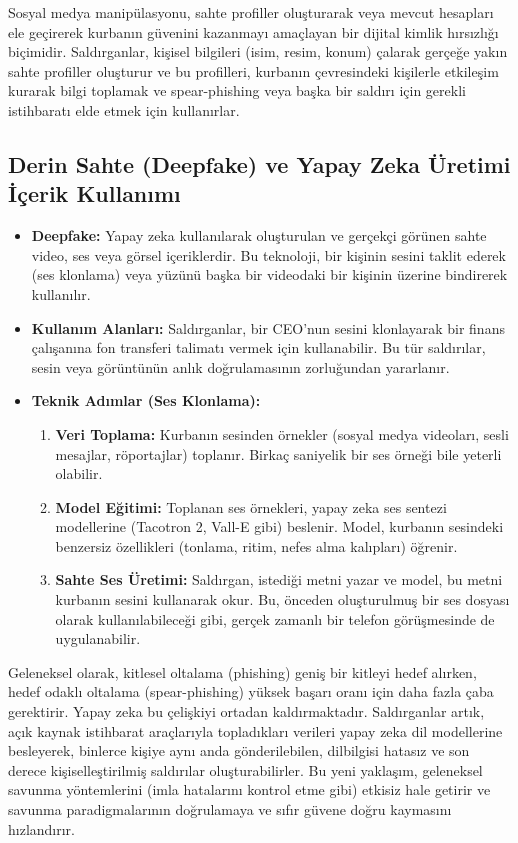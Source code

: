 Sosyal medya manipülasyonu, sahte profiller oluşturarak veya mevcut hesapları ele geçirerek kurbanın güvenini kazanmayı amaçlayan bir dijital kimlik hırsızlığı biçimidir. Saldırganlar, kişisel bilgileri (isim, resim, konum) çalarak gerçeğe yakın sahte profiller oluşturur ve bu profilleri, kurbanın çevresindeki kişilerle etkileşim kurarak bilgi toplamak ve spear-phishing veya başka bir saldırı için gerekli istihbaratı elde etmek için kullanırlar.

\subsection{Derin Sahte (Deepfake) ve Yapay Zeka Üretimi İçerik Kullanımı}

\begin{itemize}
    \item \textbf{Deepfake:} Yapay zeka kullanılarak oluşturulan ve gerçekçi görünen sahte video, ses veya görsel içeriklerdir. Bu teknoloji, bir kişinin sesini taklit ederek (ses klonlama) veya yüzünü başka bir videodaki bir kişinin üzerine bindirerek kullanılır.
    \item \textbf{Kullanım Alanları:} Saldırganlar, bir CEO'nun sesini klonlayarak bir finans çalışanına fon transferi talimatı vermek için kullanabilir. Bu tür saldırılar, sesin veya görüntünün anlık doğrulamasının zorluğundan yararlanır.
    \item \textbf{Teknik Adımlar (Ses Klonlama):}
    \begin{enumerate}
        \item \textbf{Veri Toplama:} Kurbanın sesinden örnekler (sosyal medya videoları, sesli mesajlar, röportajlar) toplanır. Birkaç saniyelik bir ses örneği bile yeterli olabilir.
        \item \textbf{Model Eğitimi:} Toplanan ses örnekleri, yapay zeka ses sentezi modellerine (Tacotron 2, Vall-E gibi) beslenir. Model, kurbanın sesindeki benzersiz özellikleri (tonlama, ritim, nefes alma kalıpları) öğrenir.
        \item \textbf{Sahte Ses Üretimi:} Saldırgan, istediği metni yazar ve model, bu metni kurbanın sesini kullanarak okur. Bu, önceden oluşturulmuş bir ses dosyası olarak kullanılabileceği gibi, gerçek zamanlı bir telefon görüşmesinde de uygulanabilir.
    \end{enumerate}
\end{itemize}

Geleneksel olarak, kitlesel oltalama (phishing) geniş bir kitleyi hedef alırken, hedef odaklı oltalama (spear-phishing) yüksek başarı oranı için daha fazla çaba gerektirir. Yapay zeka bu çelişkiyi ortadan kaldırmaktadır. Saldırganlar artık, açık kaynak istihbarat araçlarıyla topladıkları verileri yapay zeka dil modellerine besleyerek, binlerce kişiye aynı anda gönderilebilen, dilbilgisi hatasız ve son derece kişiselleştirilmiş saldırılar oluşturabilirler. Bu yeni yaklaşım, geleneksel savunma yöntemlerini (imla hatalarını kontrol etme gibi) etkisiz hale getirir ve savunma paradigmalarının doğrulamaya ve sıfır güvene doğru kaymasını hızlandırır.

